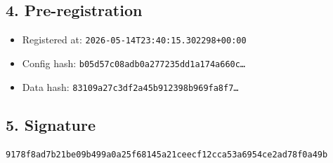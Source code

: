 \documentclass{article}
\begin{document}
\subsection*{4. Pre-registration}
\begin{itemize}
\item Registered at: \texttt{2026-05-14T23:40:15.302298+00:00}
\item Config hash: \texttt{b05d57c08adb0a277235dd1a174a660c\dots}
\item Data hash: \texttt{83109a27c3df2a45b912398b969fa8f7\dots}
\end{itemize}
\subsection*{5. Signature}
\texttt{9178f8ad7b21be09b499a0a25f68145a21ceecf12cca53a6954ce2ad78f0a49b}\\
\end{document}
